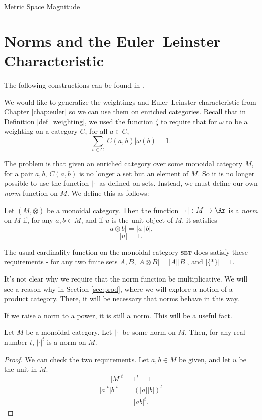 \documentclass[12pt]{pom_thesis}
\newcommand{\catname}[1]{\textbf{\textsc{#1}}}
\begin{document}
\begin{chapter}{Metric Space Magnitude}
\section{Norms and the Euler--Leinster Characteristic}
The following constructions can be found in \cite{Nog1, Lein4}.

We would like to generalize the weightings and Euler--Leinster characteristic from Chapter \ref{chap:euler} so we can use them on enriched categories. Recall that in Definition \ref{def_weighting}, we used the function $\zeta$ to require that for $\omega$ to be a weighting on a category $C$, for all $a \in C$,
\[
\sum_{b \in C}|C(a,b)|\omega(b) = 1.
\]

The problem is that given an enriched category over some monoidal category $M$, for a pair $a,b$, $C(a,b)$ is no longer a set but an element of $M$. So it is no longer possible to use the function $|\cdot|$ as defined on sets. Instead, we must define our own \emph{norm} function on $M$. We define this as follows:
\begin{defn}\label{def:norm}
Let $(M,\otimes)$ be a monoidal category. Then the function $| \cdot |: M \rightarrow \Rr$ is a \emph{norm} on $M$ if, for any $a,b\in M$, and if $u$ is the unit object of $M$, it satisfies
\[
|a \otimes b| = |a||b|,
\]
\[
|u| = 1.
\]
\end{defn}

The usual cardinality function on the monoidal category \catname{set} does satisfy these requirements - for any two finite sets $A,B, |A \otimes B| = |A||B|$, and $|\{*\}|=1$.

It's not clear why we require that the norm function be multiplicative. We will see a reason why in Section \ref{sec:prod}, where we will explore a notion of a product category. There, it will be necessary that norms behave in this way.

If we raise a norm to a power, it is still a norm. This will be a useful fact.
\begin{lemma}\label{lem:exp_norm}
Let $M$ be a monoidal category. Let $|\cdot|$ be some norm on $M$. Then, for any real number $t$,  $|\cdot|^t$ is a norm on $M$.
\end{lemma}
\begin{proof}
We can check the two requirements. Let $a,b \in M$ be given, and let $u$ be the unit in $M$.
\[|M|^t = 1^t = 1
\]
\begin{align*}
|a|^t|b|^t &= (|a||b|)^t\\
&= |ab|^t.
\end{align*}
\end{proof}


\end{chapter}
\end{document}

